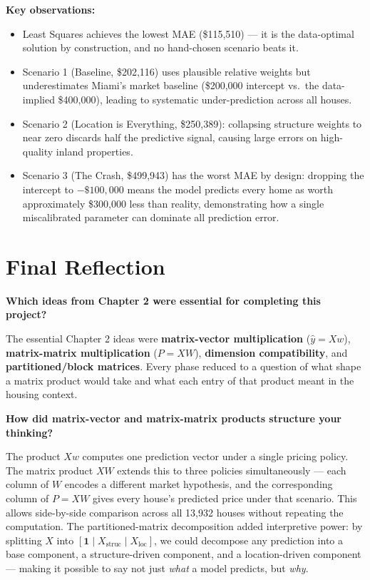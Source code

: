 \documentclass[11pt]{article}
\begin{document}
\textbf{Key observations:}
\begin{itemize}
    \item Least Squares achieves the lowest MAE (\$115,510) --- it is the data-optimal solution by construction, and no hand-chosen scenario beats it.
    \item Scenario 1 (Baseline, \$202,116) uses plausible relative weights but underestimates Miami's market baseline (\$200,000 intercept vs.\ the data-implied \$400,000), leading to systematic under-prediction across all houses.
    \item Scenario 2 (Location is Everything, \$250,389): collapsing structure weights to near zero discards half the predictive signal, causing large errors on high-quality inland properties.
    \item Scenario 3 (The Crash, \$499,943) has the worst MAE by design: dropping the intercept to $-\$100{,}000$ means the model predicts every home as worth approximately \$300,000 less than reality, demonstrating how a single miscalibrated parameter can dominate all prediction error.
\end{itemize}

\section{Final Reflection}

\textbf{Which ideas from Chapter 2 were essential for completing this project?}

The essential Chapter 2 ideas were \textbf{matrix-vector multiplication} ($\hat{y} = Xw$), \textbf{matrix-matrix multiplication} ($P = XW$), \textbf{dimension compatibility}, and \textbf{partitioned/block matrices}. Every phase reduced to a question of what shape a matrix product would take and what each entry of that product meant in the housing context.

\textbf{How did matrix-vector and matrix-matrix products structure your thinking?}

The product $Xw$ computes one prediction vector under a single pricing policy. The matrix product $XW$ extends this to three policies simultaneously --- each column of $W$ encodes a different market hypothesis, and the corresponding column of $P = XW$ gives every house's predicted price under that scenario. This allows side-by-side comparison across all 13,932 houses without repeating the computation. The partitioned-matrix decomposition added interpretive power: by splitting $X$ into $[\mathbf{1} \mid X_{\text{struc}} \mid X_{\text{loc}}]$, we could decompose any prediction into a base component, a structure-driven component, and a location-driven component --- making it possible to say not just \emph{what} a model predicts, but \emph{why}.
\end{document}
